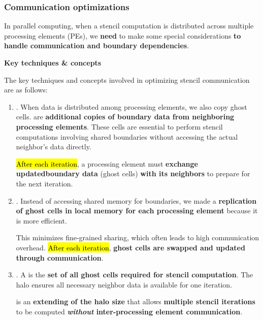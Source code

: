 \subsubsection{Communication optimizations}

In parallel computing, when a stencil computation is distributed across multiple processing elements (PEs), we \textbf{need} to make some special considerations \textbf{to handle communication and boundary dependencies}.

\highspace
\begin{flushleft}
    \textcolor{Green3}{ \textbf{Key techniques \& concepts}}
\end{flushleft}
The key techniques and concepts involved in optimizing stencil communication are as follows:
\begin{enumerate}
    \item {}. When data is distributed among processing elements, we also copy ghost cells.  are \textbf{additional copies of boundary data from neighboring processing elements}. These cells are essential to perform stencil computations involving shared boundaries without accessing the actual neighbor's data directly.

    \hl{After each iteration}, a processing element must \textbf{exchange updated\break boundary data} (ghost cells) \textbf{with its neighbors} to prepare for the next iteration.


    \item {}. Instead of accessing shared memory for boundaries, we made a \textbf{replication of ghost cells in local memory for each processing element} because it is more efficient.

    This minimizes fine-grained sharing, which often leads to high communication overhead. \hl{After each iteration}, \textbf{ghost cells are swapped and updated through communication}.
    
    
    \item {}. A  is the \textbf{set of all ghost cells required for stencil computation}. The halo ensures all necessary neighbor data is available for one iteration.

     is an \textbf{extending of the halo size} that allows \textbf{multiple stencil iterations} to be computed \textbf{\emph{without} inter-processing element communication}.
    

\end{enumerate}

